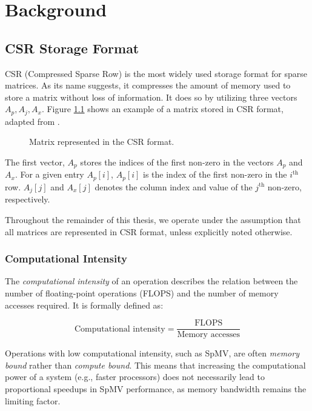 \chapter{Background}

\section{CSR Storage Format}
CSR (Compressed Sparse Row) is the most widely used storage format for sparse matrices. As its name suggests, it compresses the amount of memory used to store a matrix without loss of information. It does so by utilizing three vectors \(A_{p}, A_{j}, A_{x}\). Figure \ref{fig:csrformat} shows an example of a matrix stored in CSR format, adapted from \cite{gupta2024gamgi}.

\begin{figure}[ht]
    \centering
    \caption{Matrix represented in the CSR format.}
    \label{fig:csrformat}
\end{figure}

The first vector, \(A_{p}\) stores the indices of the first non-zero in the vectors \(A_{p}\) and \(A_{x}\). For a given entry \(A_{p}[i]\), \(A_{p}[i]\) is the index of the first non-zero in the \(i^{\text{th}}\) row. \(A_{j}[j]\) and \(A_{x}[j]\) denotes the column index and value of the \(j^{\text{th}}\) non-zero, respectively.
\medskip

Throughout the remainder of this thesis, we operate under the assumption that all matrices are represented in CSR format, unless explicitly noted otherwise.


\subsection{Computational Intensity}

The \textit{computational intensity} of an operation describes the relation between the number of floating-point operations (FLOPS) and the number of memory accesses required. It is formally defined as:

\begin{equation}
    \text{Computational intensity} = \frac{\text{FLOPS}}{\text{Memory accesses}}
    \label{eq:computationaldensity}
\end{equation}

Operations with low computational intensity, such as SpMV, are often \textit{memory bound} rather than \textit{compute bound}. This means that increasing the computational power of a system (e.g., faster processors) does not necessarily lead to proportional speedups in SpMV performance, as memory bandwidth remains the limiting factor.

